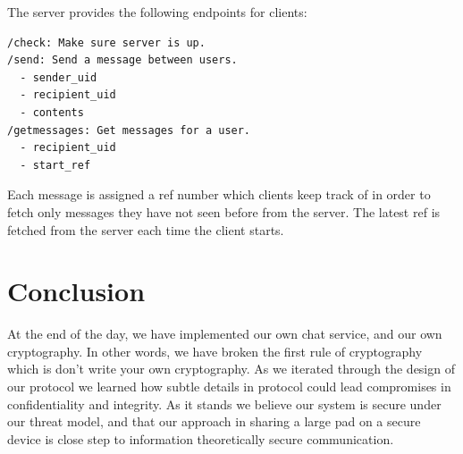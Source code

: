 \documentclass[twocolumn]{article}
\begin{document}
The server provides the following endpoints for clients:
\begin{lstlisting}
/check: Make sure server is up.
/send: Send a message between users.
  - sender_uid
  - recipient_uid
  - contents
/getmessages: Get messages for a user.
  - recipient_uid
  - start_ref
\end{lstlisting}

Each message is assigned a ref number which clients keep track of in order
to fetch only messages they have not seen before from the server.
The latest ref is fetched from the server each time the client starts.



\section{Conclusion}
At the end of the day, we have implemented our own chat service, and our own cryptography. In other words, we have broken the first rule of cryptography which is don't write your own cryptography. As we iterated through the design of our protocol we learned how subtle details in protocol could lead compromises in confidentiality and integrity. As it stands we believe our system is secure under our threat model, and that our approach in sharing a large pad on a secure device is close step to information theoretically secure communication.


\end{document}
